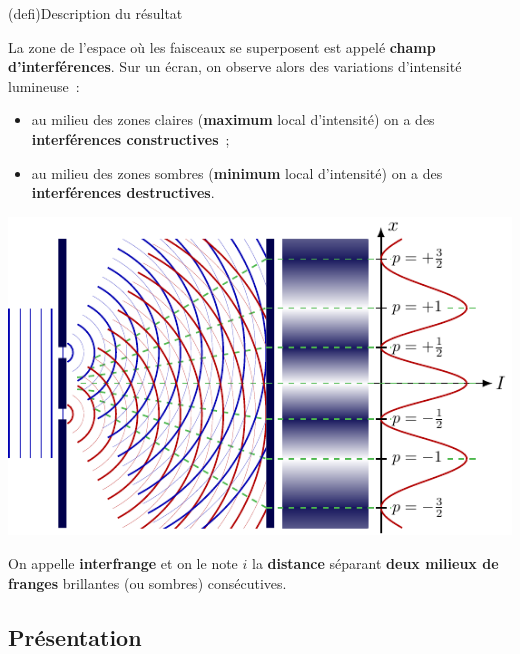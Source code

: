 \documentclass[../../main/main.tex]{subfiles}
\begin{document}
\begin{tcb}(defi){Description du résultat}
	\begin{isd}
		La zone de l'espace où les faisceaux se superposent est appelé \textbf{champ
			d'interférences}. Sur un écran, on observe alors des variations
		d'intensité lumineuse~:
		\begin{itemize}
			\item au milieu des zones claires (\textbf{maximum} local d'intensité)
			      on a des \textbf{interférences constructives}~;
			\item au milieu des zones sombres (\textbf{minimum} local d'intensité)
			      on a des \textbf{interférences destructives}.
		\end{itemize}
		\tcblower
		\begin{center}
			\includegraphics[width=\linewidth]{young_result}
		\end{center}
	\end{isd}
	On appelle \textbf{interfrange} et on le note $i$ la \textbf{distance}
	séparant \textbf{deux milieux de franges} brillantes (ou sombres)
	consécutives.
\end{tcb}

\subsection{Présentation}
\end{document}
